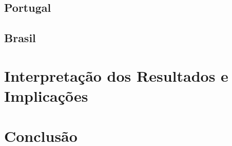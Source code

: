 \subsection{Portugal}

\subsection{Brasil}


\section{Interpretação dos Resultados e Implicações}

\section{Conclusão}

